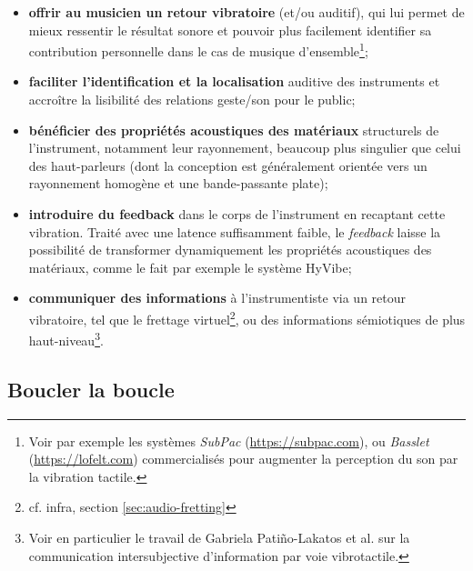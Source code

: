 \vspace{-1em}
\begin{itemize}[noitemsep]
	\item \textbf{offrir au musicien un retour vibratoire} (et/ou auditif), qui lui permet de mieux ressentir le résultat sonore et pouvoir plus facilement identifier sa contribution personnelle dans le cas de musique d'ensemble\footnote{Voir par exemple les systèmes \textit{SubPac} (\url{https://subpac.com}), ou \textit{Basslet} (\url{https://lofelt.com}) commercialisés pour augmenter la perception du son par la vibration tactile.};
	\item \textbf{faciliter l'identification et la localisation} auditive des instruments et accroître la lisibilité des relations geste/son pour le public;
	\item \textbf{bénéficier des propriétés acoustiques des matériaux} structurels de l'instrument, notamment leur rayonnement, beaucoup plus singulier que celui des haut-parleurs (dont la conception est généralement orientée vers un rayonnement homogène et une bande-passante plate);
	\item \textbf{introduire du feedback} dans le corps de l'instrument en recaptant cette vibration. Traité avec une latence suffisamment faible, le \textit{feedback} laisse la possibilité de transformer dynamiquement les propriétés acoustiques des matériaux, comme le fait par exemple le système HyVibe;
	\item \textbf{communiquer des informations} à l'instrumentiste via un retour vibratoire, tel que le frettage virtuel\footnote{cf. infra, section \ref{sec:audio-fretting}}, ou des informations sémiotiques de plus haut-niveau\footnote{Voir en particulier le travail de Gabriela Patiño-Lakatos et al. \cite{patino-lakatos_paradigmes_2019} sur la communication intersubjective d'information par voie vibrotactile.}.
\end{itemize}

\subsection{Boucler la boucle}

